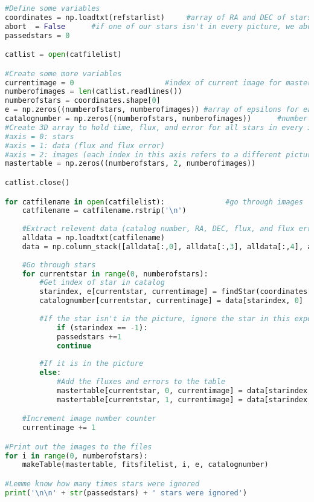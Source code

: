 \documentclass{aastex}
\begin{document}
\begin{lstlisting}[language = Python, caption = Outputs the flux and its error for each star in every exposure as well as the time for each image (YM)]
#Define some variables
coordinates = np.loadtxt(refstarlist)     #array of RA and DEC of stars
abort  = False      #if one of our stars isn't in every picture, we abort code to replace it
passedstars = 0

catlist = open(catfilelist)

#Create some more variables
currentimage = 0                     #index of current image for mastertable
numberofimages = len(catlist.readlines())
numberofstars = coordinates.shape[0]
e = np.zeros((numberofstars, numberofimages)) #array of epsilons for each star in each exposure
catalognumber = np.zeros((numberofstars, numberofimages))      #number in the catalog
#Create 3D array to hold time, flux, and error for all stars in every image
#axis = 0: stars
#axis = 1: data (flux and flux error)
#axis = 2: images (each index in this axis refers to a different picture)
mastertable = np.zeros((numberofstars, 2, numberofimages))

catlist.close()

for catfilename in open(catfilelist):              #go through images
	catfilename = catfilename.rstrip('\n')
	
	#Extract relevent data (catalog number, RA, DEC, flux, and flux error)
	alldata = np.loadtxt(catfilename)
	data = np.column_stack([alldata[:,0], alldata[:,3], alldata[:,4], alldata[:,5], alldata[:,6]])
	
	#Go through stars
	for currentstar in range(0, numberofstars):  
		#Get index of star in catalog  
		starindex, e[currentstar, currentimage] = findStar(coordinates[currentstar, :], data) 
		catalognumber[currentstar, currentimage] = data[starindex, 0] 	
		
		#If the star isn't in the picture, ignore the star in this exposure
			if (starindex == -1):
			passedstars +=1
			continue
	
		#If it is in the picture
		else:
			#Add the fluxes and errors to the table                   
			mastertable[currentstar, 0, currentimage] = data[starindex,3]
			mastertable[currentstar, 1, currentimage] = data[starindex,4]

	#Increment image number counter
	currentimage += 1

#Print out the images to the files
for i in range(0, numberofstars):
	makeTable(mastertable, fitsfilelist, i, e, catalognumber)

#Lemme know how many times stars were ignored
print('\n\n' + str(passedstars) + ' stars were ignored')
\end{lstlisting}
\end{document}
